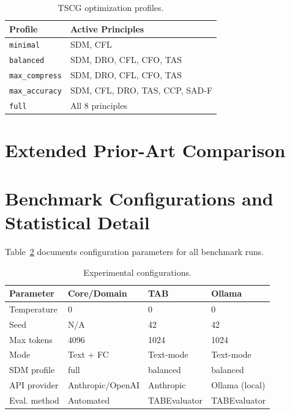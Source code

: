 \documentclass[11pt,a4paper]{article}
\begin{document}
\begin{table}[h]
\centering
\small
\caption{TSCG optimization profiles.}
\label{tab:profiles}
\begin{tabular}{@{}lp{5cm}@{}}
\toprule
\textbf{Profile} & \textbf{Active Principles} \\
\midrule
\texttt{minimal} & SDM, CFL \\
\texttt{balanced} & SDM, DRO, CFL, CFO, TAS \\
\texttt{max\_compress} & SDM, DRO, CFL, CFO, TAS \\
\texttt{max\_accuracy} & SDM, CFL, DRO, TAS, CCP, SAD-F \\
\texttt{full} & All 8 principles \\
\bottomrule
\end{tabular}
\end{table}

\section{Extended Prior-Art Comparison}
\label{app:prior-art}



\section{Benchmark Configurations and Statistical Detail}
\label{app:configs}

Table~\ref{tab:run-configs} documents configuration parameters for all benchmark runs.

\begin{table}[h]
\centering
\small
\caption{Experimental configurations.}
\label{tab:run-configs}
\begin{tabular}{@{}llll@{}}
\toprule
\textbf{Parameter} & \textbf{Core/Domain} & \textbf{TAB} & \textbf{Ollama} \\
\midrule
Temperature & 0 & 0 & 0 \\
Seed & N/A & 42 & 42 \\
Max tokens & 4096 & 1024 & 1024 \\
Mode & Text + FC & Text-mode & Text-mode \\
SDM profile & full & balanced & balanced \\
API provider & Anthropic/OpenAI & Anthropic & Ollama (local) \\
Eval. method & Automated & TABEvaluator & TABEvaluator \\
\bottomrule
\end{tabular}
\end{table}
\end{document}

